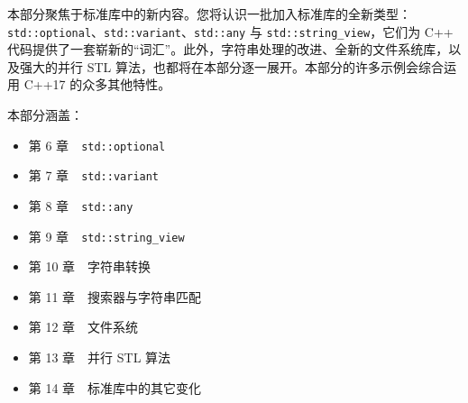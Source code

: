 本部分聚焦于标准库中的新内容。您将认识一批加入标准库的全新类型：\texttt{std::optional}、\texttt{std::variant}、\texttt{std::any} 与 \texttt{std::string\_view}，它们为 C++ 代码提供了一套崭新的“词汇”。此外，字符串处理的改进、全新的文件系统库，以及强大的并行 STL 算法，也都将在本部分逐一展开。本部分的许多示例会综合运用 C++17 的众多其他特性。

本部分涵盖：

\begin{itemize}
  \item 第 6 章　\texttt{std::optional}
  \item 第 7 章　\texttt{std::variant}
  \item 第 8 章　\texttt{std::any}
  \item 第 9 章　\texttt{std::string\_view}
  \item 第 10 章　字符串转换
  \item 第 11 章　搜索器与字符串匹配
  \item 第 12 章　文件系统
  \item 第 13 章　并行 STL 算法
  \item 第 14 章　标准库中的其它变化
\end{itemize}
